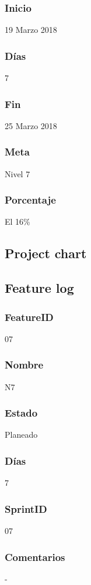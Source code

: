 \subsubsection{Inicio}
19 Marzo 2018
\subsubsection{Días}
7
\subsubsection{Fin}
25 Marzo 2018
\subsubsection{Meta}
Nivel 7
\subsubsection{Porcentaje}
El 16\% 


\subsection{Project chart}



\subsection{Feature log}

\subsubsection{FeatureID}
07
\subsubsection{Nombre}
N7
\subsubsection{Estado}
Planeado
\subsubsection{Días}
7
\subsubsection{SprintID}
07
\subsubsection{Comentarios}
-


